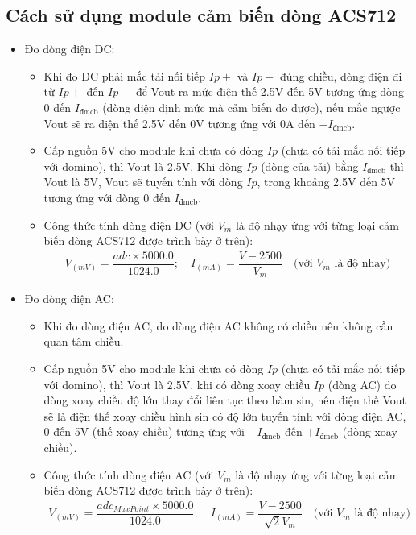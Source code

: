 \subsection{Cách sử dụng module cảm biến dòng ACS712}
    \begin{itemize}
        \item Đo dòng điện DC:
            \begin{itemize}
                \item Khi đo DC phải mắc tải nối tiếp $Ip+$ và $Ip-$ đúng chiều, dòng điện đi từ $Ip+$ đến $Ip-$ để Vout ra mức điện thế 2.5V đến 5V tương ứng dòng 0 đến $I_{\textrm{đmcb}}$ (dòng điện định mức mà cảm biến đo được), nếu mắc ngược Vout sẽ ra điện thế 2.5V đến 0V tương ứng với 0A đến $-I_{\textrm{đmcb}}$.
                \item Cấp nguồn 5V cho module khi chưa có dòng $Ip$ (chưa có tải mắc nối tiếp với domino), thì Vout là 2.5V. Khi dòng $Ip$ (dòng của tải) bằng $I_{\textrm{đmcb}}$ thì Vout là 5V, Vout sẽ tuyến tính với dòng $Ip$, trong khoảng 2.5V đến 5V tương ứng với dòng 0 đến $I_{\textrm{đmcb}}$.
                \item Công thức tính dòng điện DC (với $V_m$ là độ nhạy ứng với từng loại cảm biến dòng ACS712 được trình bày ở trên):
                    \begin{align*}
                        V_{(mV)} = \dfrac{adc \times 5000.0}{1024.0};\quad I_{(mA)} = \dfrac{V - 2500}{V_m} \quad \textrm{(với } V_m \textrm{ là độ nhạy)}
                    \end{align*}
            \end{itemize}

        \item Đo dòng điện AC:
            \begin{itemize}
                \item Khi đo dòng điện AC, do dòng điện AC không có chiều nên không cần quan tâm chiều.
                \item Cấp nguồn 5V cho module khi chưa có dòng $Ip$ (chưa có tải mắc nối tiếp với domino), thì Vout là 2.5V. khi có dòng xoay chiều $Ip$ (dòng AC) do dòng xoay chiều độ lớn thay đổi liên tục theo hàm sin, nên điện thế Vout sẽ là điện thế xoay chiều hình sin có độ lớn tuyến tính với dòng điện AC, 0 đến 5V (thế xoay chiều) tương ứng với $-I_{\textrm{đmcb}}$ đến $+I_{\textrm{đmcb}}$ (dòng xoay chiều).
                \item Công thức tính dòng điện AC (với $V_m$ là độ nhạy ứng với từng loại cảm biến dòng ACS712 được trình bày ở trên):
                    \begin{align*}
                        V_{(mV)} = \dfrac{adc_{MaxPoint} \times 5000.0}{1024.0};\quad I_{(mA)} = \dfrac{V - 2500}{\sqrt{2}V_m} \quad \textrm{(với } V_m \textrm{ là độ nhạy)}
                    \end{align*}
            \end{itemize}
    \end{itemize}

